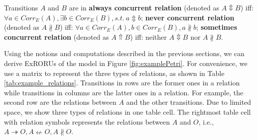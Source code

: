 \documentclass[dvips,...]{llncs}
\begin{document}
\begin{definition}\label{def:concurrentRelations}
Transitions $A$ and $B$ are in \textbf{always concurrent relation} (denoted as $A\Updownarrow B$) iff: $\forall a\in Corr_{E}(A),\exists b\in Corr_{E}(B),s.t.~a\Updownarrow b$; \textbf{never concurrent relation} (denoted as $A\nparallel B$) iff: $\forall a\in Corr_{E}(A),b\in Corr_{E}(B),a\nparallel b$; \textbf{sometimes concurrent relation} (denoted as $A\Uparrow B$) iff: neither $A\Updownarrow B$ nor $A\nparallel B$.
\end{definition}

Using the notions and computations described in the previous sections, we can derive ExRORUs of the model in Figure \ref{fig:examplePetri}. For convenience, we use a matrix to represent the three types of relations, as shown in Table \ref{tab:example_relations}. Transitions in rows are the former ones in a relation while transitions in columns are the latter ones in a relation. For example, the second row are the relations between $A$ and the other transitions. Due to limited space, we show three types of relations in one table cell. The rightmost table cell with relation symbols represents the relations between $A$ and $O$, i.e., $A\twoheadrightarrow O,A\nleftarrow O,A\nparallel O$.
\end{document}
